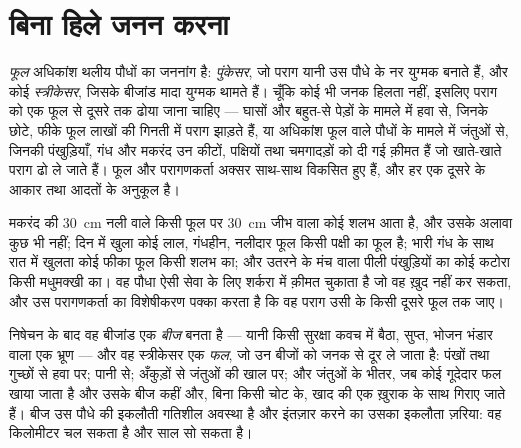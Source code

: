 \section{बिना हिले जनन करना}

\begin{proposition}[फूल और उनके मेहमान]\label{prop:g12:plant-rooted-life:flowers}
\emph{फूल} अधिकांश थलीय पौधों का जननांग है: \emph{पुंकेसर}, जो पराग यानी उस
पौधे के नर युग्मक बनाते हैं, और कोई \emph{स्त्रीकेसर}, जिसके बीजांड मादा
युग्मक थामते हैं। चूँकि कोई भी जनक हिलता नहीं, इसलिए पराग को एक फूल से दूसरे
तक ढोया जाना चाहिए --- घासों और बहुत-से पेड़ों के मामले में हवा से, जिनके
छोटे, फीके फूल लाखों की गिनती में पराग झाड़ते हैं, या अधिकांश फूल वाले
पौधों के मामले में जंतुओं से, जिनकी पंखुड़ियाँ, गंध और मकरंद उन कीटों,
पक्षियों तथा चमगादड़ों को दी गई क़ीमत हैं जो खाते-खाते पराग ढो ले जाते हैं।
फूल और परागणकर्ता अक्सर साथ-साथ विकसित हुए हैं, और हर एक दूसरे के आकार तथा
आदतों के अनुकूल है।
\end{proposition}
\admitted

\begin{example}[मेल खाते आकार]\label{ex:g12:plant-rooted-life:match}
मकरंद की \qty{30}{cm} नली वाले किसी फूल पर \qty{30}{cm} जीभ वाला कोई शलभ
आता है, और उसके अलावा कुछ भी नहीं; दिन में खुला कोई लाल, गंधहीन, नलीदार फूल
किसी पक्षी का फूल है; भारी गंध के साथ रात में खुलता कोई फीका फूल किसी शलभ का;
और उतरने के मंच वाला पीली पंखुड़ियों का कोई कटोरा किसी मधुमक्खी का। वह पौधा
ऐसी सेवा के लिए शर्करा में क़ीमत चुकाता है जो वह ख़ुद नहीं कर सकता, और उस
परागणकर्ता का विशेषीकरण पक्का करता है कि वह पराग उसी  के किसी दूसरे फूल
तक जाए।
\end{example}

\begin{proposition}[फल और प्रकीर्णन]\label{prop:g12:plant-rooted-life:dispersal}
निषेचन के बाद वह बीजांड एक \emph{बीज} बनता है --- यानी किसी सुरक्षा कवच में
बैठा, सुप्त, भोजन भंडार वाला एक भ्रूण --- और वह स्त्रीकेसर एक \emph{फल}, जो
उन बीजों को जनक से दूर ले जाता है: पंखों तथा गुच्छों से हवा पर; पानी से;
अँकुड़ों से जंतुओं की खाल पर; और जंतुओं के भीतर, जब कोई गूदेदार फल खाया जाता
है और उसके बीज कहीं और, बिना किसी चोट के, खाद की एक ख़ुराक के साथ गिराए
जाते हैं। बीज उस पौधे की इकलौती गतिशील अवस्था है और इंतज़ार करने का उसका
इकलौता ज़रिया: वह किलोमीटर चल सकता है और साल सो सकता है।
\end{proposition}
\admitted

